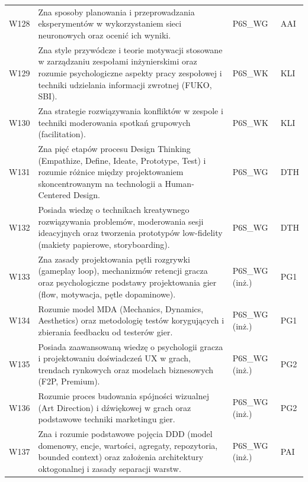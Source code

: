 \documentclass[12pt,a4paper]{article}
\begin{document}
{\begin{longtable}{m{1cm}m{8.8cm}m{2.1cm}m{2.5cm}}
\rowcolor{tableRowAlt} W128 & Zna sposoby planowania i przeprowadzania eksperymentów w wykorzystaniem sieci neuronowych oraz ocenić ich wyniki. & {\scriptsize P6S\_WG} & {\scriptsize AAI} \\
\rowcolor{tableRowLight} W129 & Zna style przywódcze i teorie motywacji stosowane w zarządzaniu zespołami inżynierskimi oraz rozumie psychologiczne aspekty pracy zespołowej i techniki udzielania informacji zwrotnej (FUKO, SBI). & {\scriptsize P6S\_WK} & {\scriptsize KLI} \\
\rowcolor{tableRowAlt} W130 & Zna strategie rozwiązywania konfliktów w zespole i techniki moderowania spotkań grupowych (facilitation). & {\scriptsize P6S\_WK} & {\scriptsize KLI} \\
\rowcolor{tableRowLight} W131 & Zna pięć etapów procesu Design Thinking (Empathize, Define, Ideate, Prototype, Test) i rozumie różnice między projektowaniem skoncentrowanym na technologii a Human-Centered Design. & {\scriptsize P6S\_WG} & {\scriptsize DTH} \\
\rowcolor{tableRowAlt} W132 & Posiada wiedzę o technikach kreatywnego rozwiązywania problemów, moderowania sesji ideacyjnych oraz tworzenia prototypów low-fidelity (makiety papierowe, storyboarding). & {\scriptsize P6S\_WG} & {\scriptsize DTH} \\
\rowcolor{tableRowLight} W133 & Zna zasady projektowania pętli rozgrywki (gameplay loop), mechanizmów retencji gracza oraz psychologiczne podstawy projektowania gier (flow, motywacja, pętle dopaminowe). & {\scriptsize P6S\_WG {\scriptsize (inż.)}} & {\scriptsize PG1} \\
\rowcolor{tableRowAlt} W134 & Rozumie model MDA (Mechanics, Dynamics, Aesthetics) oraz metodologię testów korygujących i zbierania feedbacku od testerów gier. & {\scriptsize P6S\_WG {\scriptsize (inż.)}} & {\scriptsize PG1} \\
\rowcolor{tableRowLight} W135 & Posiada zaawansowaną wiedzę o psychologii gracza i projektowaniu doświadczeń UX w grach, trendach rynkowych oraz modelach biznesowych (F2P, Premium). & {\scriptsize P6S\_WG {\scriptsize (inż.)}} & {\scriptsize PG2} \\
\rowcolor{tableRowAlt} W136 & Rozumie proces budowania spójności wizualnej (Art Direction) i dźwiękowej w grach oraz podstawowe techniki marketingu gier. & {\scriptsize P6S\_WG {\scriptsize (inż.)}} & {\scriptsize PG2} \\
\rowcolor{tableRowLight} W137 & Zna i rozumie podstawowe pojęcia DDD (model domenowy, encje, wartości, agregaty, repozytoria, bounded context) oraz założenia architektury oktogonalnej i zasady separacji warstw. & {\scriptsize P6S\_WG {\scriptsize (inż.)}} & {\scriptsize PAI} \\

\end{longtable}}
\end{document}
